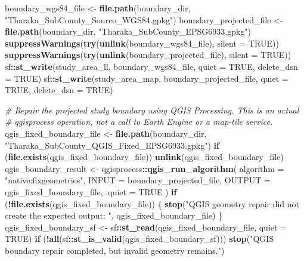 \documentclass[
]{article}
\newenvironment{Shaded}{\begin{snugshade}}{\end{snugshade}}
\newcommand{\AttributeTok}[1]{\textcolor[rgb]{0.13,0.29,0.53}{#1}}
\newcommand{\CommentTok}[1]{\textcolor[rgb]{0.56,0.35,0.01}{\textit{#1}}}
\newcommand{\ConstantTok}[1]{\textcolor[rgb]{0.56,0.35,0.01}{#1}}
\newcommand{\ControlFlowTok}[1]{\textcolor[rgb]{0.13,0.29,0.53}{\textbf{#1}}}
\newcommand{\FunctionTok}[1]{\textcolor[rgb]{0.13,0.29,0.53}{\textbf{#1}}}
\newcommand{\NormalTok}[1]{#1}
\newcommand{\OtherTok}[1]{\textcolor[rgb]{0.56,0.35,0.01}{#1}}
\newcommand{\SpecialCharTok}[1]{\textcolor[rgb]{0.81,0.36,0.00}{\textbf{#1}}}
\newcommand{\StringTok}[1]{\textcolor[rgb]{0.31,0.60,0.02}{#1}}
\begin{document}
\begin{Shaded}
\begin{Highlighting}[]
\NormalTok{boundary\_wgs84\_file }\OtherTok{\textless{}{-}} \FunctionTok{file.path}\NormalTok{(boundary\_dir, }\StringTok{"Tharaka\_SubCounty\_Source\_WGS84.gpkg"}\NormalTok{)}
\NormalTok{boundary\_projected\_file }\OtherTok{\textless{}{-}} \FunctionTok{file.path}\NormalTok{(boundary\_dir, }\StringTok{"Tharaka\_SubCounty\_EPSG6933.gpkg"}\NormalTok{)}
\FunctionTok{suppressWarnings}\NormalTok{(}\FunctionTok{try}\NormalTok{(}\FunctionTok{unlink}\NormalTok{(boundary\_wgs84\_file), }\AttributeTok{silent =} \ConstantTok{TRUE}\NormalTok{))}
\FunctionTok{suppressWarnings}\NormalTok{(}\FunctionTok{try}\NormalTok{(}\FunctionTok{unlink}\NormalTok{(boundary\_projected\_file), }\AttributeTok{silent =} \ConstantTok{TRUE}\NormalTok{))}
\NormalTok{sf}\SpecialCharTok{::}\FunctionTok{st\_write}\NormalTok{(study\_area\_ll, boundary\_wgs84\_file, }\AttributeTok{quiet =} \ConstantTok{TRUE}\NormalTok{, }\AttributeTok{delete\_dsn =} \ConstantTok{TRUE}\NormalTok{)}
\NormalTok{sf}\SpecialCharTok{::}\FunctionTok{st\_write}\NormalTok{(study\_area\_map, boundary\_projected\_file, }\AttributeTok{quiet =} \ConstantTok{TRUE}\NormalTok{, }\AttributeTok{delete\_dsn =} \ConstantTok{TRUE}\NormalTok{)}

\CommentTok{\# Repair the projected study boundary using QGIS Processing. This is an actual}
\CommentTok{\# qgisprocess operation, not a call to Earth Engine or a map{-}tile service.}
\NormalTok{qgis\_fixed\_boundary\_file }\OtherTok{\textless{}{-}} \FunctionTok{file.path}\NormalTok{(boundary\_dir, }\StringTok{"Tharaka\_SubCounty\_QGIS\_Fixed\_EPSG6933.gpkg"}\NormalTok{)}
\ControlFlowTok{if}\NormalTok{ (}\FunctionTok{file.exists}\NormalTok{(qgis\_fixed\_boundary\_file)) }\FunctionTok{unlink}\NormalTok{(qgis\_fixed\_boundary\_file)}
\NormalTok{qgis\_boundary\_result }\OtherTok{\textless{}{-}}\NormalTok{ qgisprocess}\SpecialCharTok{::}\FunctionTok{qgis\_run\_algorithm}\NormalTok{(}
  \AttributeTok{algorithm =} \StringTok{"native:fixgeometries"}\NormalTok{,}
  \AttributeTok{INPUT =}\NormalTok{ boundary\_projected\_file,}
  \AttributeTok{OUTPUT =}\NormalTok{ qgis\_fixed\_boundary\_file,}
  \AttributeTok{.quiet =} \ConstantTok{TRUE}
\NormalTok{)}
\ControlFlowTok{if}\NormalTok{ (}\SpecialCharTok{!}\FunctionTok{file.exists}\NormalTok{(qgis\_fixed\_boundary\_file)) \{}
  \FunctionTok{stop}\NormalTok{(}\StringTok{"QGIS geometry repair did not create the expected output: "}\NormalTok{, qgis\_fixed\_boundary\_file)}
\NormalTok{\}}
\NormalTok{qgis\_fixed\_boundary\_sf }\OtherTok{\textless{}{-}}\NormalTok{ sf}\SpecialCharTok{::}\FunctionTok{st\_read}\NormalTok{(qgis\_fixed\_boundary\_file, }\AttributeTok{quiet =} \ConstantTok{TRUE}\NormalTok{)}
\ControlFlowTok{if}\NormalTok{ (}\SpecialCharTok{!}\FunctionTok{all}\NormalTok{(sf}\SpecialCharTok{::}\FunctionTok{st\_is\_valid}\NormalTok{(qgis\_fixed\_boundary\_sf))) }\FunctionTok{stop}\NormalTok{(}\StringTok{"QGIS boundary repair completed, but invalid geometry remains."}\NormalTok{)}


\end{Highlighting}
\end{Shaded}
\end{document}
